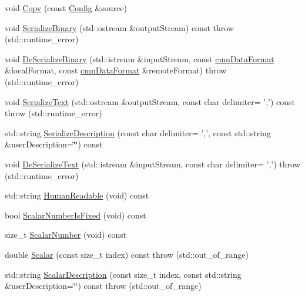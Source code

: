 \begin{DoxyCompactItemize}
\item 
void \hyperlink{classsvl_filter_source_video_capture_types_1_1_config_ac818f164fdddfd98751c86ed2d5bb7f2}{Copy} (const \hyperlink{classsvl_filter_source_video_capture_types_1_1_config}{Config} \&source)
\item 
void \hyperlink{classsvl_filter_source_video_capture_types_1_1_config_ad16b74558d897858416cc5b4a4eea9bf}{Serialize\-Binary} (std\-::ostream \&output\-Stream) const   throw (std\-::runtime\-\_\-error)
\item 
void \hyperlink{classsvl_filter_source_video_capture_types_1_1_config_a40bbf0c83f28355bb883e092e8592fb3}{De\-Serialize\-Binary} (std\-::istream \&input\-Stream, const \hyperlink{classcmn_data_format}{cmn\-Data\-Format} \&local\-Format, const \hyperlink{classcmn_data_format}{cmn\-Data\-Format} \&remote\-Format)  throw (std\-::runtime\-\_\-error)
\item 
void \hyperlink{classsvl_filter_source_video_capture_types_1_1_config_abc2c0142079b290b2680346b7b1f4e10}{Serialize\-Text} (std\-::ostream \&output\-Stream, const char delimiter= ',') const   throw (std\-::runtime\-\_\-error)
\item 
std\-::string \hyperlink{classsvl_filter_source_video_capture_types_1_1_config_a947b1edb033336b74d8d8d7343afaed8}{Serialize\-Description} (const char delimiter= ',', const std\-::string \&user\-Description=\char`\"{}\char`\"{}) const 
\item 
void \hyperlink{classsvl_filter_source_video_capture_types_1_1_config_a21f1e84466f18ed2ac11a06b6ba5e8eb}{De\-Serialize\-Text} (std\-::istream \&input\-Stream, const char delimiter= ',')  throw (std\-::runtime\-\_\-error)
\item 
std\-::string \hyperlink{classsvl_filter_source_video_capture_types_1_1_config_af205f9ed5f63bd5efc41a0a5d4625b50}{Human\-Readable} (void) const 
\item 
bool \hyperlink{classsvl_filter_source_video_capture_types_1_1_config_a292ad08109ee5eea2ed25310018ee01d}{Scalar\-Number\-Is\-Fixed} (void) const 
\item 
size\-\_\-t \hyperlink{classsvl_filter_source_video_capture_types_1_1_config_a34f1bd01e7545dcc37c25d71e91e82cb}{Scalar\-Number} (void) const 
\item 
double \hyperlink{classsvl_filter_source_video_capture_types_1_1_config_a291e2c8628ba8d172670d4ab4f737220}{Scalar} (const size\-\_\-t index) const   throw (std\-::out\-\_\-of\-\_\-range)
\item 
std\-::string \hyperlink{classsvl_filter_source_video_capture_types_1_1_config_adf13117f2e4e61a9d27a6be9f8ead615}{Scalar\-Description} (const size\-\_\-t index, const std\-::string \&user\-Description=\char`\"{}\char`\"{}) const   throw (std\-::out\-\_\-of\-\_\-range)
\end{DoxyCompactItemize}
